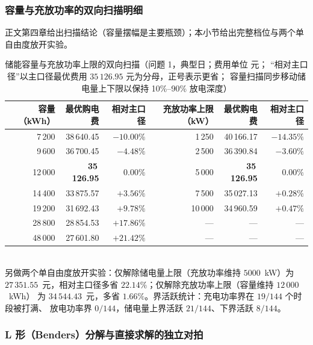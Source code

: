 \subsubsection{容量与充放功率的双向扫描明细}\label{sec:scan-app}

正文第四章给出扫描结论（容量摆幅是主要瓶颈）；本小节给出完整档位与两个单自由度放开实验。

\begin{table}[htbp]
  \centering
  \caption{储能容量与充放功率上限的双向扫描（问题 1，典型日；费用单位 元；
           “相对主口径”以主口径最优费用 $35\,126.95$ 元为分母，正号表示更省；
           容量扫描同步移动储电量上下限以保持 10\%--90\% 放电深度）}
  \label{tab:scan-app}
  \footnotesize
  \setlength{\tabcolsep}{5pt}
  \begin{tabular}{rrr|rrr}
    \toprule
    容量（kWh） & 最优购电费 & 相对主口径 & 充放功率上限（kW） & 最优购电费 & 相对主口径 \\
    \midrule
    7\,200  & 38\,640.45 & \(-10.00\%\) & 1\,250  & 40\,166.17 & \(-14.35\%\) \\
    9\,600  & 36\,700.45 & \(-4.48\%\)  & 2\,500  & 36\,390.84 & \(-3.60\%\) \\
    12\,000 & \textbf{35\,126.95} & \(0.00\%\) & 5\,000 & \textbf{35\,126.95} & \(0.00\%\) \\
    14\,400 & 33\,875.57 & \(+3.56\%\)  & 7\,500  & 35\,027.13 & \(+0.28\%\) \\
    19\,200 & 31\,692.43 & \(+9.78\%\)  & 10\,000 & 34\,960.59 & \(+0.47\%\) \\
    28\,800 & 28\,854.53 & \(+17.86\%\) & ---     & ---        & --- \\
    48\,000 & 27\,601.80 & \(+21.42\%\) & ---     & ---        & --- \\
    \bottomrule
  \end{tabular}
  \\[1ex]
  {\footnotesize 另做两个单自由度放开实验：仅解除储电量上限（充放功率维持 $5000$~kW）为
   $27\,351.55$~元，相对主口径多省 $22.14\%$；仅解除充放功率上限（容量维持 $12\,000$~kWh）
   为 $34\,544.43$~元，多省 $1.66\%$。界活跃统计：充电功率界在 $19/144$ 个时段被打满、
   放电功率界 $0/144$，储电量上界活跃 $21/144$、下界活跃 $8/144$。}
\end{table}

\subsubsection{L 形（Benders）分解与直接求解的独立对拍}\label{sec:lshape}

